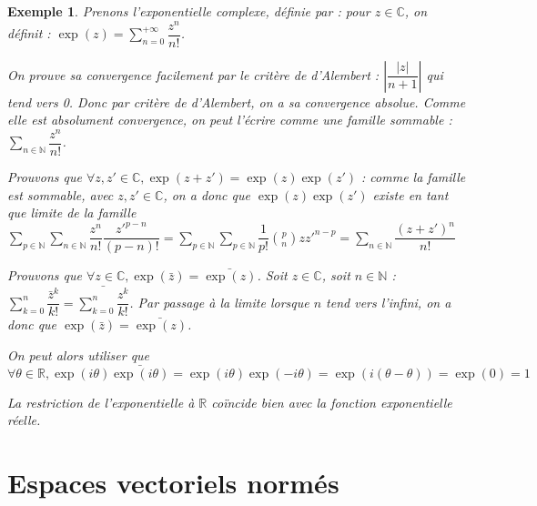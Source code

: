 \documentclass[a4paper,12pt]{book}
\newtheorem{Exe}{Exemple}[section]
\def\R{\mathbb{R}}
\def\C{\mathbb{C}}
\def\N{\mathbb{N}}
\begin{document}
\begin{Exe}
Prenons l'exponentielle complexe, définie par : pour $z\in\C$, on définit : $\exp(z) = \sum\limits_{n=0}^{+\infty} \dfrac{z^n}{n!}$.
\par On prouve sa convergence facilement par le critère de d'Alembert : $\left\vert\dfrac{\vert z\vert}{n+1}\right\vert$ qui tend vers 0. Donc par critère de d'Alembert, on a sa convergence absolue. Comme elle est absolument convergence, on peut l'écrire comme une famille sommable : $\sum\limits_{n\in\N}\dfrac{z^n}{n!}$.
\par Prouvons que $\forall z,z'\in\C, \exp(z+z') = \exp(z)\exp(z')$ : comme la famille est sommable, avec $z,z'\in\C$, on a donc que $\exp(z)\exp(z')$ existe en tant que limite de la famille $\sum\limits_{p\in\N}\sum\limits_{n\in\N} \dfrac{z^n}{n!}\dfrac{z'^{p-n}}{(p-n)!} = \sum\limits_{p\in\N}\sum\limits_{p\in\N} \dfrac{1}{p!}\binom{p}{n}zz'^{n-p} = \sum\limits_{n\in\N} \dfrac{(z+z')^{n}}{n!}$
\par Prouvons que $\forall z\in\C, \exp(\bar{z}) = \bar{\exp(z)}$. Soit $z\in\C$, soit $n\in\N$ : $\sum\limits_{k=0}^n \dfrac{\bar{z}^k}{k!} = \bar{\sum\limits_{k=0}^n\dfrac{z^k}{k!}}$. Par passage à la limite lorsque $n$ tend vers l'infini, on a donc que $\exp(\bar{z})=\bar{\exp(z)}$.
\par On peut alors utiliser que $\forall \theta\in\R, \exp(i\theta)\bar{\exp(i\theta)} = \exp(i\theta)\exp(-i\theta) = \exp(i(\theta - \theta)) = \exp(0) = 1$
\par La restriction de l'exponentielle à $\R$ coïncide bien avec la fonction exponentielle réelle.
\end{Exe}



\chapter{Espaces vectoriels normés}
\end{document}
